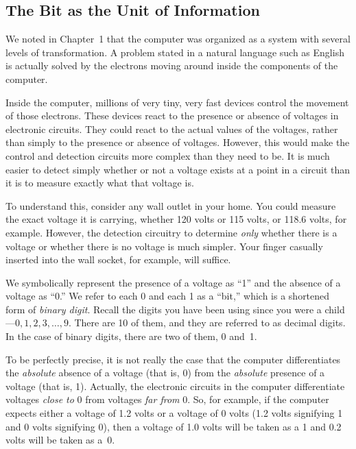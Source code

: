 \documentclass{patt}
\begin{document}
\subsection{The Bit as the Unit of Information}

We noted in Chapter~1 that the computer was organized as a system with
several levels of transformation.  A problem stated in a natural
language such as English is actually solved by the electrons moving
around inside the components of the computer.

Inside the computer, millions of very tiny, very fast devices control
the movement of those electrons.  These devices react to the presence
or absence of voltages in electronic circuits.  They could react to
the actual values of the voltages, rather than simply to the presence 
or absence of
voltages. However, this would make the control and detection circuits
more complex than they need to be.  It is much easier to detect simply
whether or not a voltage exists at a point in a circuit
than it is to measure exactly what that voltage is.

To understand this, consider any wall outlet in your home.  You could
measure the exact voltage it is carrying, whether 120 volts or 115
volts, or 118.6 volts, for example.  However, the detection circuitry
to determine {\em only} whether there is a voltage 
or whether there is no voltage is much simpler.  Your
finger casually inserted into the wall socket, for example, will
suffice.

We symbolically represent the presence of a voltage as ``1'' and the
absence of a voltage as ``0.''  We refer to each 0 and each 1 as a
``bit,'' which is a shortened  form of
{\em binary digit}. Recall the digits you have been using since you were a
child---$0,1,2,3,\ldots,9$. There are 10 of them, and they are
referred to as decimal digits.  In the case of binary digits, there
are two of them, 0 and~1.

To be perfectly precise, it is not really the case that the computer
differentiates the {\em absolute} absence of a voltage (that is, 0)
from the {\em absolute} presence of a voltage (that is, 1).  Actually,
the electronic circuits in the computer differentiate voltages {\em
  close to} 0 from voltages {\em far from} 0.  So, for example, if the
computer expects either a voltage of 1.2 volts or a voltage of 0 volts (1.2
volts signifying 1 and 0 volts signifying 0), then a voltage of 1.0
volts will be taken as a 1 and 0.2 volts will be taken as a~0.
\end{document}
